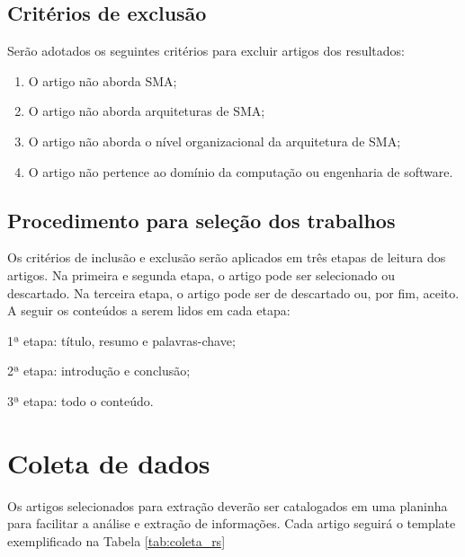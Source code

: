 \subsection{Critérios de exclusão}

Serão adotados os seguintes critérios para excluir artigos dos resultados:

\begin{enumerate}
    \item O artigo não aborda SMA;
    \item O artigo não aborda arquiteturas de SMA;
    \item O artigo não aborda o nível organizacional da arquitetura de SMA;
    \item O artigo não pertence ao domínio da computação ou engenharia de software.
\end{enumerate}

\subsection{Procedimento para seleção dos trabalhos}

Os critérios de inclusão e exclusão serão aplicados em três etapas de leitura dos artigos. Na primeira e segunda etapa, o artigo pode ser selecionado ou descartado. Na terceira etapa, o artigo pode ser de descartado ou, por fim, aceito. A seguir os conteúdos a serem lidos em cada etapa:

\par 1ª etapa: título, resumo e palavras-chave;
\par 2ª etapa: introdução e conclusão;
\par 3ª etapa: todo o conteúdo.

\section{Coleta de dados}

Os artigos selecionados para extração deverão ser catalogados em uma planinha para facilitar a análise e extração de informações. Cada artigo seguirá o template exemplificado na Tabela \ref{tab:coleta_rs}

